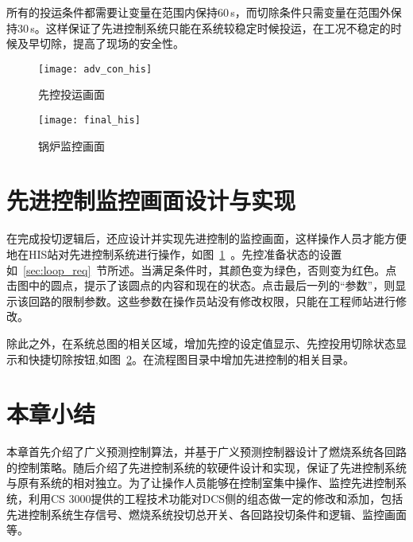 所有的投运条件都需要让变量在范围内保持60$\,$\si{s}，而切除条件只需变量在范围外保持30$\,$\si{s}。这样保证了先进控制系统只能在系统较稳定时候投运，在工况不稳定的时候及早切除，提高了现场的安全性。

\begin{figure}[!hbt]
\centering
\texttt{[image: adv\_con\_his]}
\caption{先控投运画面} \label{fig:adv_con_his}
\end{figure}

\begin{figure}[!hbt]
\centering
\texttt{[image: final\_his]}
\caption{锅炉监控画面} \label{fig:final_his}
\end{figure}

\section{先进控制监控画面设计与实现}  

在完成投切逻辑后，还应设计并实现先进控制的监控画面，这样操作人员才能方便地在HIS站对先进控制系统进行操作，如图~\ref{fig:adv_con_his}~。先控准备状态的设置如~\ref{sec:loop_req}~节所述。当满足条件时，其颜色变为绿色，否则变为红色。点击图中的圆点，提示了该圆点的内容和现在的状态。点击最后一列的“参数”，则显示该回路的限制参数。这些参数在操作员站没有修改权限，只能在工程师站进行修改。


除此之外，在系统总图的相关区域，增加先控的设定值显示、先控投用切除状态显示和快捷切除按钮,如图~\ref{fig:final_his}。在流程图目录中增加先进控制的相关目录。

\section{本章小结}
本章首先介绍了广义预测控制算法，并基于广义预测控制器设计了燃烧系统各回路的控制策略。随后介绍了先进控制系统的软硬件设计和实现，保证了先进控制系统与原有系统的相对独立。为了让操作人员能够在控制室集中操作、监控先进控制系统，利用CS 3000提供的工程技术功能对DCS侧的组态做一定的修改和添加，包括先进控制系统生存信号、燃烧系统投切总开关、各回路投切条件和逻辑、监控画面等。